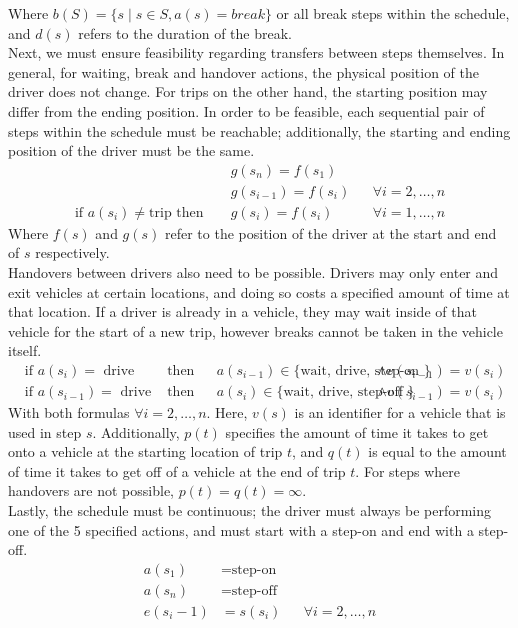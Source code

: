 \documentclass[]{article}
\begin{document}
Where $b(S) = \{ s \mid s \in S, a(s) = break \}$ or all break steps within the schedule, and $d(s)$ refers to the duration of the break. \\
Next, we must ensure feasibility regarding transfers between steps themselves. In general, for waiting, break and handover actions, the physical position of the driver does not change. For trips on the other hand, the starting position may differ from the ending position. In order to be feasible, each sequential pair of steps within the schedule must be reachable; additionally, the starting and ending position of the driver must be the same.
\begin{align}
  && g(s_n) = f(s_1) && \\
  && g(s_{i-1}) = f(s_i) && \forall i = 2, \dots, n \\
  \text{if } a(s_i) \neq \text{trip} \text{ then } && g(s_i) = f(s_i) && \forall i = 1, \dots, n
\end{align}
Where $f(s)$ and $g(s)$ refer to the position of the driver at the start and end of $s$ respectively. \\
Handovers between drivers also need to be possible. Drivers may only enter and exit vehicles at certain locations, and doing so costs a specified amount of time at that location. If a driver is already in a vehicle, they may wait inside of that vehicle for the start of a new trip, however breaks cannot be taken in the vehicle itself.
\begin{align}
  &\text{if } a(s_i) = \text{ drive}&\text{ then} && a(s_{i-1}) \in \text{\{ wait, drive, step-on \}} & \land v(s_{i-1}) = v(s_{i}) \\
  &\text{if } a(s_{i-1}) = \text{ drive}&\text{ then} && a(s_{i}) \in \text{\{ wait, drive, step-off \}} & \land v(s_{i-1}) = v(s_{i}) 
\end{align}
With both formulas $\forall i = 2, \dots, n$. Here, $v(s)$ is an identifier for a vehicle that is used in step $s$. Additionally, $p(t)$ specifies the amount of time it takes to get onto a vehicle at the starting location of trip $t$, and $q(t)$ is equal to the amount of time it takes to get off of a vehicle at the end of trip $t$. For steps where handovers are not possible, $p(t) = q(t) = \infty$. \\
Lastly, the schedule must be continuous; the driver must always be performing one of the 5 specified actions, and must start with a step-on and end with a step-off. 
\begin{align}
  a(s_1) &= \text{step-on} && \\
  a(s_n) &= \text{step-off} && \\
  e(s_i-1) &= s(s_i) && \forall i = 2, \dots, n \\
\end{align}
\end{document}
